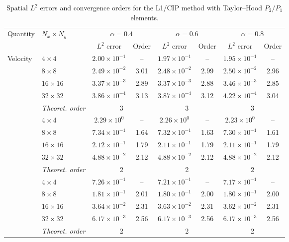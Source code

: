 \documentclass[11pt,a4paper]{article}
\numberwithin{equation}{section}
\renewcommand{\arraystretch}{1.25}
\theoremstyle{plain}
\theoremstyle{definition}
\theoremstyle{remark}
\begin{document}
\begin{table}[htbp]
\centering
\caption{Spatial $L^2$ errors and convergence orders for the L1/CIP
method with Taylor--Hood $P_2/P_1$ elements.}
\label{tab:ex1-space-cip}
\setlength{\tabcolsep}{6pt}
\renewcommand{\arraystretch}{1.15}
\begin{tabular}{llcc|cc|cc}
\toprule
\multirow{2}{*}{Quantity} & \multirow{2}{*}{$N_x\times N_y$}
& \multicolumn{2}{c|}{$\alpha=0.4$}
& \multicolumn{2}{c|}{$\alpha=0.6$}
& \multicolumn{2}{c}{$\alpha=0.8$} \\
\cmidrule(lr){3-4}
\cmidrule(lr){5-6}
\cmidrule(l){7-8}
& & $L^2$ error & Order
  & $L^2$ error & Order
  & $L^2$ error & Order \\
\midrule

\multirow{5}{*}{Velocity}
& $4\times4$   & $2.00\times10^{-1}$ & --   & $1.97\times10^{-1}$ & --   & $1.95\times10^{-1}$ & --   \\
& $8\times8$   & $2.49\times10^{-2}$ & 3.01 & $2.48\times10^{-2}$ & 2.99 & $2.50\times10^{-2}$ & 2.96 \\
& $16\times16$ & $3.37\times10^{-3}$ & 2.89 & $3.37\times10^{-3}$ & 2.88 & $3.46\times10^{-3}$ & 2.85 \\
& $32\times32$ & $3.86\times10^{-4}$ & 3.13 & $3.87\times10^{-4}$ & 3.12 & $4.22\times10^{-4}$ & 3.04 \\
& \textit{Theoret. order}
& \multicolumn{2}{c|}{3}
& \multicolumn{2}{c|}{3}
& \multicolumn{2}{c}{3} \\

\addlinespace
\multirow{5}{*}{Stress}
& $4\times4$   & $2.29\times10^{0}$  & --   & $2.26\times10^{0}$  & --   & $2.23\times10^{0}$  & --   \\
& $8\times8$   & $7.34\times10^{-1}$ & 1.64 & $7.32\times10^{-1}$ & 1.63 & $7.30\times10^{-1}$ & 1.61 \\
& $16\times16$ & $2.12\times10^{-1}$ & 1.79 & $2.11\times10^{-1}$ & 1.79 & $2.11\times10^{-1}$ & 1.79 \\
& $32\times32$ & $4.88\times10^{-2}$ & 2.12 & $4.88\times10^{-2}$ & 2.12 & $4.88\times10^{-2}$ & 2.12 \\
& \textit{Theoret. order}
& \multicolumn{2}{c|}{2}
& \multicolumn{2}{c|}{2}
& \multicolumn{2}{c}{2} \\

\addlinespace
\multirow{5}{*}{Energy norm}
& $4\times4$   & $7.26\times10^{-1}$ & --   & $7.21\times10^{-1}$ & --   & $7.17\times10^{-1}$ & --   \\
& $8\times8$   & $1.81\times10^{-1}$ & 2.01 & $1.80\times10^{-1}$ & 2.00 & $1.80\times10^{-1}$ & 2.00 \\
& $16\times16$ & $3.64\times10^{-2}$ & 2.31 & $3.63\times10^{-2}$ & 2.31 & $3.62\times10^{-2}$ & 2.31 \\
& $32\times32$ & $6.17\times10^{-3}$ & 2.56 & $6.17\times10^{-3}$ & 2.56 & $6.17\times10^{-3}$ & 2.56 \\
& \textit{Theoret. order}
& \multicolumn{2}{c|}{2}
& \multicolumn{2}{c|}{2}
& \multicolumn{2}{c}{2} \\


\end{tabular}
\end{table}
\end{document}
